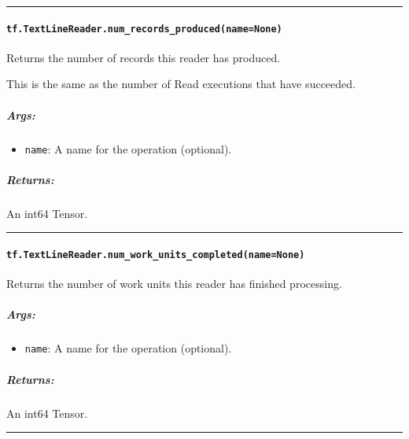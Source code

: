 \begin{center}\rule{0.5\linewidth}{\linethickness}\end{center}

\paragraph{\texorpdfstring{\texttt{tf.TextLineReader.num\_records\_produced(name=None)}
}{tf.TextLineReader.num\_records\_produced(name=None) }}\label{tf.textlinereader.numux5frecordsux5fproducednamenone}

Returns the number of records this reader has produced.

This is the same as the number of Read executions that have succeeded.

\subparagraph{Args: }\label{args-9}

\begin{itemize}
\tightlist
\item
  \texttt{name}: A name for the operation (optional).
\end{itemize}

\subparagraph{Returns: }\label{returns-7}

An int64 Tensor.

\begin{center}\rule{0.5\linewidth}{\linethickness}\end{center}

\paragraph{\texorpdfstring{\texttt{tf.TextLineReader.num\_work\_units\_completed(name=None)}
}{tf.TextLineReader.num\_work\_units\_completed(name=None) }}\label{tf.textlinereader.numux5fworkux5funitsux5fcompletednamenone}

Returns the number of work units this reader has finished processing.

\subparagraph{Args: }\label{args-10}

\begin{itemize}
\tightlist
\item
  \texttt{name}: A name for the operation (optional).
\end{itemize}

\subparagraph{Returns: }\label{returns-8}

An int64 Tensor.

\begin{center}\rule{0.5\linewidth}{\linethickness}\end{center}

